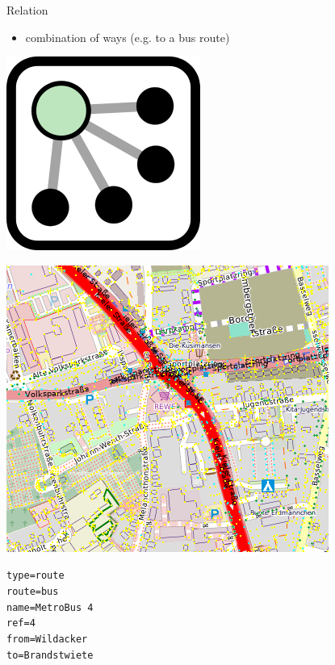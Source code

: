 \documentclass{beamer}
\begin{document}
	\begin{frame}{Relation}
		\begin{itemize}
			\item combination of ways (e.g. to a bus route)
		\end{itemize}
		
		\vfill
		
		\begin{center}
			\begin{minipage}[b][0.6\textheight][c]{0.15\linewidth}
				\centering
				\includegraphics[width=0.5\linewidth,height=0.5\textheight,keepaspectratio]{images/240px-Mf_Relation.png}
			\end{minipage}
			\begin{minipage}[b][0.6\textheight][c]{0.5\linewidth}
				\centering
				\includegraphics[width=0.8\linewidth,height=0.8\textheight,keepaspectratio]{images/relations_example.png}
			\end{minipage}
			\begin{minipage}[b][0.6\textheight][c]{0.3\linewidth}
				\texttt{type=route}\\
				\texttt{route=bus}\\
				\texttt{name=MetroBus 4}\\
				\texttt{ref=4}\\
				\texttt{from=Wildacker}\\
				\texttt{to=Brandstwiete}
			\end{minipage}
		\end{center}
	\end{frame}
			
\end{document}

